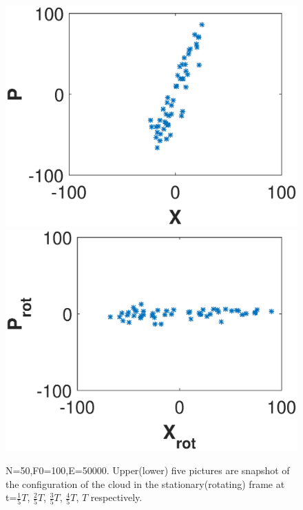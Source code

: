 \documentclass[aps,pre,twocolumn,groupedaddress]{revtex4-1}
\begin{document}
\begin{figure}
{\begin{minipage}[b]{0.18\linewidth}
\includegraphics[scale=0.21]{ZhiyuPictures/stationary_frame_t=5-5T_rev.eps} 
\includegraphics[scale=0.22]{ZhiyuPictures/rotating_frame_t=5-5T_rev.eps}
\end{minipage}
}
\caption{N=50,F0=100,E=50000. Upper(lower) five pictures are snapshot of the configuration of the cloud in the stationary(rotating) frame at t=$\frac{1}{5}T$, $\frac{2}{5}T$, $\frac{3}{5}T$, $\frac{4}{5}T$, $T$ respectively.}
\end{figure}
\end{document}
